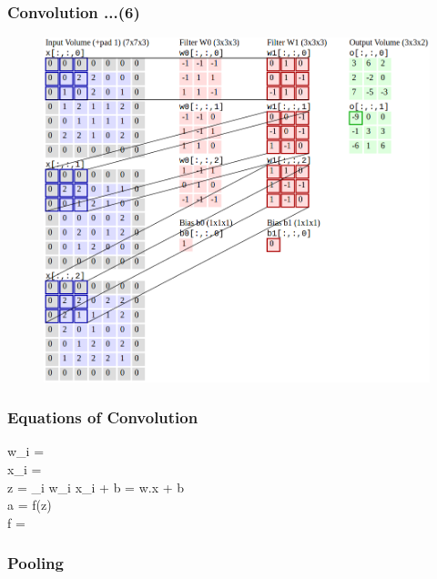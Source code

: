 \documentclass{beamer}
\newcommand*{\mathcolor}{}
\def\mathcolor#1#{\mathcoloraux{#1}}
\newcommand*{\mathcoloraux}[3]{%
  \protect\leavevmode
  \begingroup
    \color#1{#2}#3%
  \endgroup
}
\begin{document}
\begin{frame}
	\frametitle{Convolution ...(6)}
	\begin{figure}
		\includegraphics[scale=0.28]{./figures/edit/conv_08_edit.png}
	\end{figure}
\end{frame}

\begin{frame}
	\frametitle{Equations of Convolution}
	\begin{multiline}
		w_i =  \\
		x_i =  \\
		z = \sum_{i} w_i x_i + b = w.x + b  \\
		a = f(z) \\
		f =  
	\end{multiline}
\end{frame}

\subsubsection{Pooling}
\end{document}
